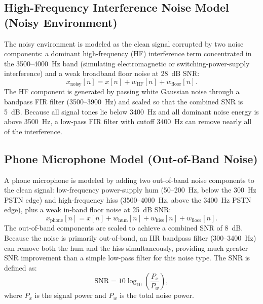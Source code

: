 \documentclass[journal]{IEEEtran}
\begin{document}
\subsection{High-Frequency Interference Noise Model (Noisy Environment)}

The noisy environment is modeled as the clean signal corrupted by two noise
components: a dominant high-frequency (HF) interference term concentrated in
the 3500--4000~Hz band (simulating electromagnetic or switching-power-supply
interference) and a weak broadband floor noise at 28~dB SNR:
\begin{equation}
  x_{\text{noisy}}[n] = x[n] + w_{\text{HF}}[n] + w_{\text{floor}}[n].
  \label{eq:noisy}
\end{equation}
The HF component is generated by passing white Gaussian noise through a bandpass
FIR filter (3500--3900~Hz) and scaled so that the combined SNR is 5~dB.
Because all signal tones lie below 3400~Hz and all dominant noise energy is above
3500~Hz, a low-pass FIR filter with cutoff 3400~Hz can remove nearly all of the
interference.

\subsection{Phone Microphone Model (Out-of-Band Noise)}

A phone microphone is modeled by adding two out-of-band noise components to the
clean signal: low-frequency power-supply hum (50--200~Hz, below the 300~Hz PSTN
edge) and high-frequency hiss (3500--4000~Hz, above the 3400~Hz PSTN edge), plus
a weak in-band floor noise at 25~dB SNR:
\begin{equation}
  x_{\text{phone}}[n] = x[n] + w_{\text{hum}}[n] + w_{\text{hiss}}[n]
                             + w_{\text{floor}}[n].
  \label{eq:phone}
\end{equation}
The out-of-band components are scaled to achieve a combined SNR of 8~dB.
Because the noise is primarily out-of-band, an IIR bandpass filter
(300--3400~Hz) can remove both the hum and the hiss simultaneously, providing
much greater SNR improvement than a simple low-pass filter for this noise type.
The SNR is defined as:
\begin{equation}
  \text{SNR} = 10\log_{10}\!\left(\frac{P_x}{P_w}\right),
  \label{eq:snrdef}
\end{equation}
where $P_x$ is the signal power and $P_w$ is the total noise power.

\end{document}

